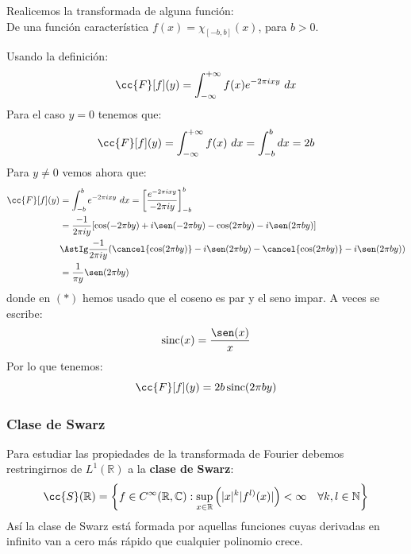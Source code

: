 \begin{ejemplo}
    Realicemos la transformada de alguna función:\\

    \noindent
    De una función característica $f(x) = \chi_{[-b,b]}(x)$, para $b>0$.

    Usando la definición:
    \begin{equation*}
        \cc{F}[f](y) = \int_{-\infty}^{+\infty} f(x)e^{-2\pi i xy}~dx 
    \end{equation*}
    Para el caso $y=0$ tenemos que:
    \begin{equation*}
        \cc{F}[f](y) = \int_{-\infty}^{+\infty} f(x)~dx = \int_{-b}^{b} dx = 2b
    \end{equation*}
    Para $y\neq 0$ vemos ahora que:
    \begin{align*}
        \cc{F}[f](y) &= \int_{-b}^{b} e^{-2\pi i xy}~dx = \left[\frac{e^{-2\pi i xy}}{-2\pi iy}\right]_{-b}^b \\ 
                     &= \frac{-1}{2\pi iy} [\cos(-2\pi by) + i\sen(-2\pi by) - \cos(2\pi by) - i\sen(2\pi by)] \\
                     &\AstIg \frac{-1}{2\pi iy}(\cancel{\cos(2\pi by)} -i\sen(2\pi by) - \cancel{\cos(2\pi by)} -i\sen(2\pi by)) \\
                     &= \frac{1}{\pi y} \sen(2\pi by)
    \end{align*}
    donde en $(\ast)$ hemos usado que el coseno es par y el seno impar. A veces se escribe:
    \begin{equation*}
        \sinc(x) = \frac{\sen(x)}{x}
    \end{equation*}
    Por lo que tenemos:
    \begin{equation*}
        \cc{F}[f](y) = 2b \sinc(2\pi by)
    \end{equation*}
\end{ejemplo}

\subsubsection{Clase de Swarz}
\noindent
Para estudiar las propiedades de la transformada de Fourier debemos restringirnos de $L^1(\mathbb{R})$ a la \textbf{clase de Swarz}:
\begin{equation*}
    \cc{S}(\mathbb{R}) = \left\{f\in C^\infty(\mathbb{R},\mathbb{C}) : \sup_{x\in \mathbb{R}}\left(|x|^k |f^{l)}(x)|\right) < \infty \quad \forall k,l\in \mathbb{N}\right\}
\end{equation*}
Así la clase de Swarz está formada por aquellas funciones cuyas derivadas en infinito van a cero más rápido que cualquier polinomio crece.\\

